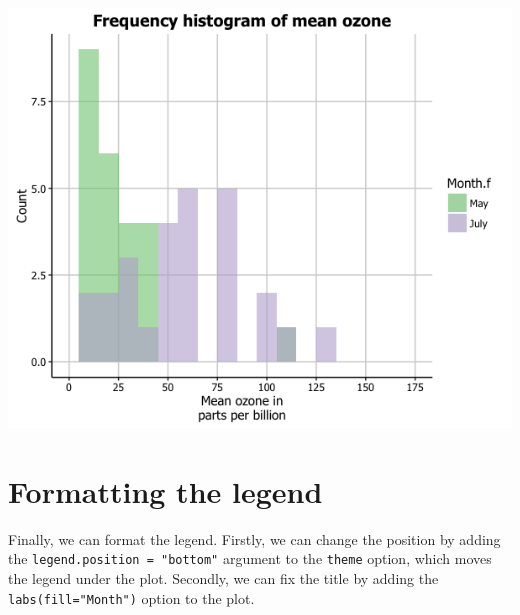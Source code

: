 \begin{center}\includegraphics[width=0.55\linewidth]{0_all_posts_pdf/histogram_19-1} \end{center}

\section{Formatting the legend}\label{formatting-the-legend}

Finally, we can format the legend. Firstly, we can change the position
by adding the \texttt{legend.position\ =\ "bottom"} argument to the
\texttt{theme} option, which moves the legend under the plot. Secondly,
we can fix the title by adding the \texttt{labs(fill="Month")} option to
the plot.

